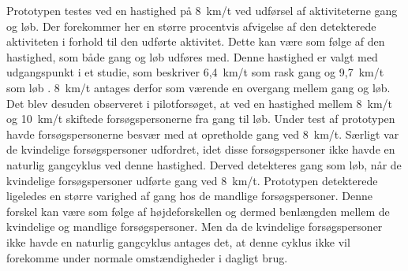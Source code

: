 Prototypen testes ved en hastighed på 8~km/t ved udførsel af aktiviteterne gang og løb. Der forekommer her en større procentvis afvigelse af den detekterede aktiviteten i forhold til den udførte aktivitet. Dette kan være som følge af den hastighed, som både gang og løb udføres med. Denne hastighed er valgt med udgangspunkt i et studie, som beskriver 6,4~km/t som rask gang og 9,7~km/t som løb \citep{Miles2007}. 8~km/t antages derfor som værende en overgang mellem gang og løb. Det blev desuden observeret i pilotforsøget, at ved en hastighed mellem 8~km/t og 10~km/t skiftede forsøgspersonerne fra gang til løb. Under test af prototypen havde forsøgspersonerne besvær med at opretholde gang ved 8~km/t. Særligt var de kvindelige forsøgspersoner udfordret, idet disse forsøgspersoner ikke havde en naturlig gangcyklus ved denne hastighed. Derved detekteres gang som løb, når de kvindelige forsøgspersoner udførte gang ved 8~km/t. Prototypen detekterede ligeledes en større varighed af gang hos de mandlige forsøgspersoner. Denne forskel kan være som følge af højdeforskellen og dermed benlængden mellem de kvindelige og mandlige forsøgspersoner. Men da de kvindelige forsøgspersoner ikke havde en naturlig gangcyklus antages det, at denne cyklus ikke vil forekomme under normale omstændigheder i dagligt brug.